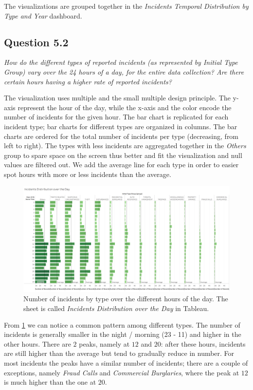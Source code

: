 The visualizations are grouped together in the \textit{Incidents Temporal Distribution by Type and Year} dashboard.


\subsection*{Question 5.2}
\textit{How do the different types of reported incidents (as represented by Initial Type Group) vary over the 24 hours of a day, for the entire data collection? Are there certain hours having a higher rate of reported incidents?}

The visualization uses multiple and the small multiple design principle.
The y-axis represent the hour of the day, while the x-axis and the color encode the number of incidents for the given hour.
The bar chart is replicated for each incident type; bar charts for different types are organized in columns.
The bar charts are ordered for the total number of incidents per type (decreasing, from left to right).
The types with less incidents are aggregated together in the \textit{Others} group to spare space on the screen thus better and fit the visualization and null values are filtered out.
We add the average line for each type in order to easier spot hours with more or less incidents than the average.

\begin{figure}[h]
	\centering
	\includegraphics[width=\columnwidth]{figures/5_2_incidents_by_type_and_hour}
	\caption{Number of incidents by type over the different hours of the day. The sheet is called \textit{Incidents Distribution over the Day} in Tableau.}
	\label{fig:5_2_incidents_by_type_and_hour}
\end{figure}

From \cref{fig:5_2_incidents_by_type_and_hour} we can notice a common pattern among different types.
The number of incidents is generally smaller in the night / morning (23 - 11) and higher in the other hours.
There are $2$ peaks, namely at $12$ and $20$: after these hours, incidents are still higher than the average but tend to gradually reduce in number.
For most incidents the peaks have a similar number of incidents; there are a couple of exceptions, namely \textit{Fraud Calls} and \textit{Commercial Burglaries}, where the peak at $12$ is much higher than the one at $20$. 


